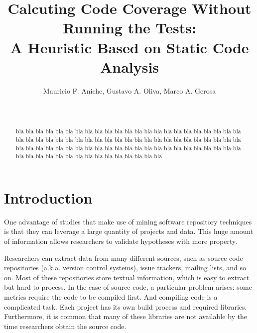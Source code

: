 \documentclass{sig-alternate}
\begin{document}

\title{Calcuting Code Coverage Without Running the Tests:\\
A Heuristic Based on Static Code Analysis}

\author{
\alignauthor
Mauricio F. Aniche, Gustavo A. Oliva, Marco A. Gerosa\\
\\
\\
}

\maketitle
\begin{abstract}

bla bla bla bla bla bla bla bla bla bla bla bla 
bla bla bla bla bla bla bla bla bla bla bla bla
bla bla bla bla bla bla bla bla bla bla bla bla
bla bla bla bla bla bla bla bla bla bla bla bla
bla bla bla bla bla bla bla bla bla bla bla bla
bla bla bla bla bla bla bla bla bla bla bla bla
bla bla bla bla bla bla bla bla bla bla bla bla


\end{abstract}

\section{Introduction}
\label{sec:intro}

One advantage of studies that make use of mining software repository techniques
is that they can leverage a large quantity of projects and data. This huge
amount of information allows researchers to validate hypotheses with more property.

Researchers can extract data from many different sources, 
such as source code repositories (a.k.a. version control systems), 
issue trackers, mailing lists, and so on. Most of these repositories 
store textual information, which is easy to extract but hard to process. 
In the case of source code, a particular problem arises: some metrics 
require the code to be compiled first. And compiling code is a complicated task. 
Each project has its own build process and required libraries. Furthermore, 
it is common that many of these libraries are not available by the time 
researchers obtain the source code.
\end{document}
